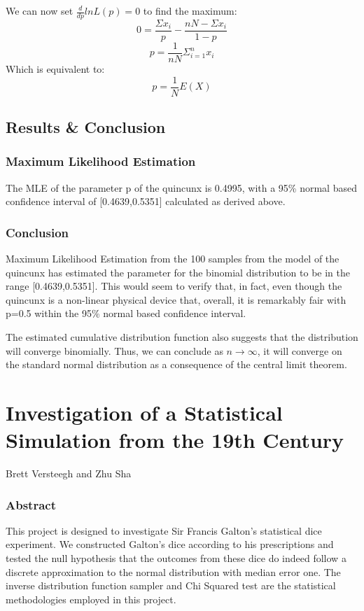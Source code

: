 We can now set $\frac{d}{dp}ln L(p)=0$ to find the maximum: $$0=\frac{\Sigma x_i}{p}-\frac{nN-\Sigma x_i}{1-p}$$
$$p=\frac{1}{nN}\Sigma^n_{i=1}x_i$$
Which is equivalent to:$$p=\frac{1}{N}E(X)$$
\subsection{Results \& Conclusion}
\subsubsection*{Maximum Likelihood Estimation}
The MLE of the parameter p of the quincunx is 0.4995, with a 95\% normal based confidence interval of [0.4639,0.5351] calculated as derived above.
\subsubsection*{Conclusion}
Maximum Likelihood Estimation from the 100 samples from the model of the quincunx has estimated the parameter for the binomial distribution to be in the range [0.4639,0.5351]. This would seem to verify that, in fact, even though the quincunx is a non-linear physical device that, overall, it is remarkably fair with p=0.5 within the 95\% normal based confidence interval.

The estimated cumulative distribution function also suggests that the distribution will converge binomially. Thus, we can conclude as $n\rightarrow \infty$, it will converge on the standard normal distribution as a consequence of the central limit theorem.
\newpage
\section{Investigation of a Statistical Simulation from the 19th Century}
\begin{center}
Brett Versteegh and Zhu Sha
\end{center}
\subsubsection*{Abstract}
This project is designed to investigate Sir Francis Galton's statistical dice experiment. We constructed Galton's dice according to his prescriptions and tested the null hypothesis that the outcomes from these dice do indeed follow a discrete approximation to the normal distribution with median error one. The inverse distribution function sampler and Chi Squared test are the statistical methodologies employed in this project.

